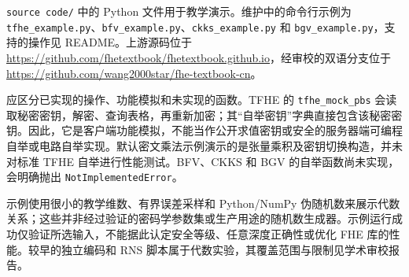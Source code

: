 \texttt{source code/} 中的 Python 文件用于教学演示。维护中的命令行示例为 \texttt{tfhe\_example.py}、\texttt{bfv\_example.py}、\texttt{ckks\_example.py} 和 \texttt{bgv\_example.py}，支持的操作见 README。上游源码位于 \url{https://github.com/fhetextbook/fhetextbook.github.io}，经审校的双语分支位于 \url{https://github.com/wang2000star/fhe-textbook-cn}。

应区分已实现的操作、功能模拟和未实现的函数。TFHE 的 \texttt{tfhe\_mock\_pbs} 会读取秘密密钥，解密、查询表格，再重新加密；其“自举密钥”字典直接包含该秘密密钥。因此，它是客户端功能模拟，不能当作公开求值密钥或安全的服务器端可编程自举或电路自举实现。默认密文乘法示例演示的是张量乘积及密钥切换构造，并未对标准 TFHE 自举进行性能测试。BFV、CKKS 和 BGV 的自举函数尚未实现，会明确抛出 \texttt{NotImplementedError}。

示例使用很小的教学维数、有界误差采样和 Python/NumPy 伪随机数来展示代数关系；这些并非经过验证的密码学参数集或生产用途的随机数生成器。示例运行成功仅验证所选输入，不能据此认定安全等级、任意深度正确性或优化 FHE 库的性能。较早的独立编码和 RNS 脚本属于代数实验，其覆盖范围与限制见学术审校报告。
